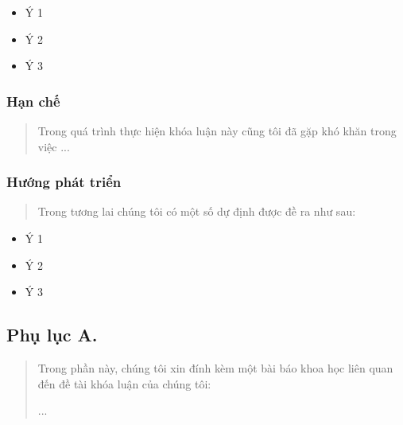 \begin{itemize}
\item
  Ý 1
\item
  Ý 2
\item
  Ý 3
\end{itemize}

\subsubsection{Hạn chế}\label{hux1ea1n-chux1ebf}

\begin{quote}
Trong quá trình thực hiện khóa luận này cũng tôi đã gặp khó khăn trong việc ...
\end{quote}

\subsubsection{Hướng phát triển}\label{hux1b0ux1edbng-phuxe1t-triux1ec3n}

\begin{quote}
Trong tương lai chúng tôi có một số dự định được đề ra như sau:
\end{quote}

\begin{itemize}
\item
  Ý 1
\item
  Ý 2
\item
  Ý 3
\end{itemize}

\subsection{\texorpdfstring{Phụ lục A. }{Phụ lục A. }}\label{phux1ee5-lux1ee5c-a.}

\begin{quote}
Trong phần này, chúng tôi xin đính kèm một bài báo khoa học liên quan đến đề tài khóa luận của chúng tôi:

...
\end{quote}
